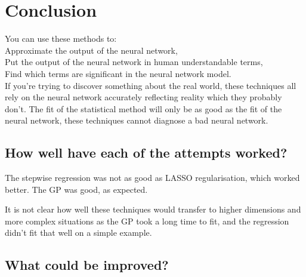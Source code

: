 
\chapter{Conclusion}

You can use these methods to:\\
Approximate the output of the neural network,\\
Put the output of the neural network in human understandable terms,\\
Find which terms are significant in the neural network model.\\

If you're trying to discover something about the real world, these techniques all rely on the neural network accurately reflecting reality which they probably don't.
The fit of the statistical method will only be as good as the fit of the neural network, these techniques cannot diagnose a bad neural network.


\section{How well have each of the attempts worked?}

The stepwise regression was not as good as \ac{LASSO} regularisation, which worked better.
The \ac{GP} was good, as expected.

It is not clear how well these techniques would transfer to higher dimensions and more complex situations as the \ac{GP} took a long time to fit, and the regression didn't fit that well on a simple example.

\section{What could be improved?}

